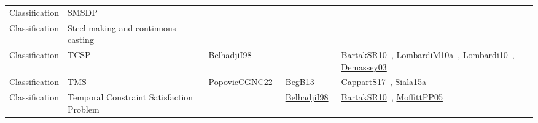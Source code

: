 {\begin{longtable}{lp{3cm}>{\raggedright\arraybackslash}p{6cm}>{\raggedright\arraybackslash}p{6cm}>{\raggedright\arraybackslash}p{8cm}}
Classification & SMSDP &  &  & \\
Classification & Steel-making and continuous casting &  &  & \\
Classification & TCSP & \href{works/BelhadjiI98.pdf}{BelhadjiI98}~\cite{BelhadjiI98} &  & \href{works/BartakSR10.pdf}{BartakSR10}~\cite{BartakSR10}, \href{works/LombardiM10a.pdf}{LombardiM10a}~\cite{LombardiM10a}, \href{works/Lombardi10.pdf}{Lombardi10}~\cite{Lombardi10}, \href{works/Demassey03.pdf}{Demassey03}~\cite{Demassey03}\\
Classification & TMS & \href{works/PopovicCGNC22.pdf}{PopovicCGNC22}~\cite{PopovicCGNC22} & \href{works/BegB13.pdf}{BegB13}~\cite{BegB13} & \href{works/CappartS17.pdf}{CappartS17}~\cite{CappartS17}, \href{works/Siala15a.pdf}{Siala15a}~\cite{Siala15a}\\
Classification & Temporal Constraint Satisfaction Problem &  & \href{works/BelhadjiI98.pdf}{BelhadjiI98}~\cite{BelhadjiI98} & \href{works/BartakSR10.pdf}{BartakSR10}~\cite{BartakSR10}, \href{works/MoffittPP05.pdf}{MoffittPP05}~\cite{MoffittPP05}\\

\end{longtable}}
